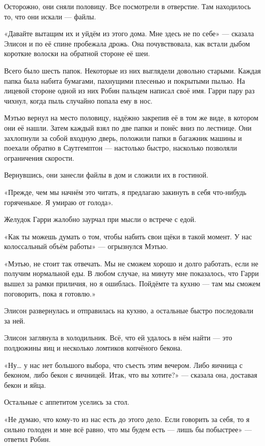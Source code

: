 \documentclass[a5paper, 9pt,
final, openany, twoside=true]{memoir}
\begin{document}
Осторожно, они сняли половицу. Все посмотрели в отверстие. Там находилось то, что они искали — файлы.

«Давайте вытащим их и уйдём из этого дома. Мне здесь не по себе» — сказала Элисон и по её спине пробежала дрожь. Она почувствовала, как встали дыбом короткие волоски на обратной стороне её шеи.

Всего было шесть папок. Некоторые из них выглядели довольно старыми. Каждая папка была набита бумагами, пахнущими плесенью и покрытыми пылью. На лицевой стороне одной из них Робин пальцем написал своё имя. Гарри пару раз чихнул, когда пыль случайно попала ему в нос.

Мэтью вернул на место половицу, надёжно закрепив её в том же виде, в котором они её нашли. Затем каждый взял по две папки и понёс вниз по лестнице. Они захлопнули за собой входную дверь, положили папки в багажник машины и поехали обратно в Саутгемптон — настолько быстро, насколько позволяли ограничения скорости.\bigskip

Вернувшись, они занесли файлы в дом и сложили их в гостиной.

«Прежде, чем мы начнём это читать, я предлагаю закинуть в себя что-нибудь горяченькое. Я умираю от голода».

Желудок Гарри жалобно заурчал при мысли о встрече с едой.

«Как ты можешь думать о том, чтобы набить свои щёки в такой момент. У нас колоссальный объём работы» — огрызнулся Мэтью.

«Мэтью, не стоит так отвечать. Мы не сможем хорошо и долго работать, если не получим нормальной еды. В любом случае, на минуту мне показалось, что Гарри вышел за рамки приличия, но я ошиблась. Пойдёмте та кухню — там мы сможем поговорить, пока я готовлю.»

Элисон развернулась и отправилась на кухню, а остальные быстро последовали за ней.\bigskip

Элисон заглянула в холодильник. Всё, что ей удалось в нём найти — это полдюжины яиц и несколько ломтиков копчёного бекона.

«Ну… у нас нет большого выбора, что съесть этим вечером. Либо яичница с беконом, либо бекон с яичницей. Итак, что вы хотите?» — сказала она, доставая бекон и яйца.

Остальные с аппетитом уселись за стол.

«Не думаю, что кому-то из нас есть до этого дело. Если говорить за себя, то я сильно голоден и мне всё равно, что мы будем есть — лишь бы побыстрее» — ответил Робин.
\end{document}
